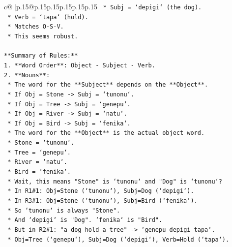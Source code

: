 \documentclass{article}
\begin{document}
{\begin{supertabular}{c@{$\;$}|p{.15\linewidth}@{}p{.15\linewidth}p{.15\linewidth}p{.15\linewidth}p{.15\linewidth}p{.15\linewidth}}
{{{\texttt{                                                                        *   Subj = `depigi` (the dog).} \\
\texttt{                                                                        *   Verb = `tapa` (hold).} \\
\texttt{                                                                        *   Matches O{-}S{-}V.} \\
\texttt{                                                                    *   This seems robust.} \\
\\ 
\texttt{**Summary of Rules:**} \\
\texttt{1.  **Word Order**: Object {-} Subject {-} Verb.} \\
\texttt{2.  **Nouns**:} \\
\texttt{    *   The word for the **Subject** depends on the **Object**.} \\
\texttt{        *   If Obj = Stone {-}> Subj = `tunonu`.} \\
\texttt{        *   If Obj = Tree {-}> Subj = `genepu`.} \\
\texttt{        *   If Obj = River {-}> Subj = `natu`.} \\
\texttt{        *   If Obj = Bird {-}> Subj = `fenika`.} \\
\texttt{    *   The word for the **Object** is the actual object word.} \\
\texttt{        *   Stone = `tunonu`.} \\
\texttt{        *   Tree = `genepu`.} \\
\texttt{        *   River = `natu`.} \\
\texttt{        *   Bird = `fenika`.} \\
\texttt{    *   Wait, this means "Stone" is `tunonu` and "Dog" is `tunonu`?} \\
\texttt{        *   In R1\#1: Obj=Stone (`tunonu`), Subj=Dog (`depigi`).} \\
\texttt{        *   In R3\#1: Obj=Stone (`tunonu`), Subj=Bird (`fenika`).} \\
\texttt{        *   So `tunonu` is always "Stone".} \\
\texttt{        *   And `depigi` is "Dog". `fenika` is "Bird".} \\
\texttt{        *   But in R2\#1: "a dog hold a tree" {-}> `genepu depigi tapa`.} \\
\texttt{            *   Obj=Tree (`genepu`), Subj=Dog (`depigi`), Verb=Hold (`tapa`).} \\
}}}
\end{supertabular}}
\end{document}
